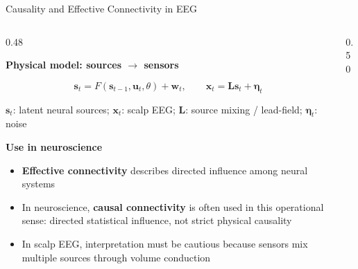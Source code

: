 \documentclass[aspectratio=169]{beamer}
\let\oldcite\cite
\renewcommand{\cite}[1]{{\tiny\oldcite{#1}}}
\begin{document}
\begin{frame}{Causality and Effective Connectivity in EEG}

\scriptsize
\setlength{\abovedisplayskip}{2pt}
\setlength{\belowdisplayskip}{2pt}
\setlength{\jot}{1pt}

\begin{columns}[T,totalwidth=\textwidth]

\begin{column}{0.48\textwidth}

\textbf{Physical model: sources $\rightarrow$ sensors}

\vspace{0.08cm}

\[
\mathbf{s}_t = F(\mathbf{s}_{t-1},\mathbf{u}_t,\theta)+\mathbf{w}_t,
\qquad
\mathbf{x}_t = \mathbf{L}\mathbf{s}_t+\boldsymbol{\eta}_t
\]

\vspace{0.02cm}

{\tiny
$\mathbf{s}_t$: latent neural sources; $\mathbf{x}_t$: scalp EEG;
$\mathbf{L}$: source mixing / lead-field; $\boldsymbol{\eta}_t$: noise
}

\vspace{0.14cm}

\textbf{Use in neuroscience}

\vspace{0.05cm}

\begin{itemize}\itemsep2pt
    \item \textbf{Effective connectivity} describes directed influence among
    neural systems \cite{friston1994functional}
    
    \item In neuroscience, \textbf{causal connectivity} is often used in this
    operational sense: directed statistical influence, not strict physical
    causality \cite{seth2015granger}
    
    \item In scalp EEG, interpretation must be cautious because sensors mix
    multiple sources through volume conduction \cite{haufe2013critical}
\end{itemize}

\end{column}

\begin{column}{0.50\textwidth}


\end{column}
\end{columns}
\end{frame}
\end{document}

